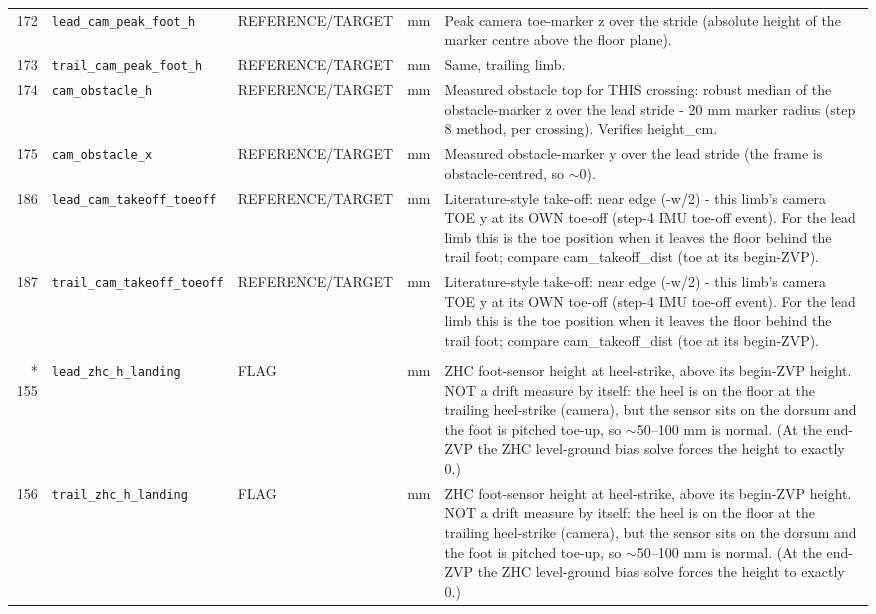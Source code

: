 \begin{longtable}{@{}r p{3.6cm} p{1.55cm} p{1.15cm} p{8.6cm}@{}}
172 & \texttt{lead\_\allowbreak{}cam\_\allowbreak{}peak\_\allowbreak{}foot\_\allowbreak{}h} & REFERENCE/TARGET & mm & Peak camera toe-marker z over the stride (absolute height of the marker centre above the floor plane). \\
173 & \texttt{trail\_\allowbreak{}cam\_\allowbreak{}peak\_\allowbreak{}foot\_\allowbreak{}h} & REFERENCE/TARGET & mm & Same, trailing limb. \\
174 & \texttt{cam\_\allowbreak{}obstacle\_\allowbreak{}h} & REFERENCE/TARGET & mm & Measured obstacle top for THIS crossing: robust median of the obstacle-marker z over the lead stride - 20 mm marker radius (step 8 method, per crossing). Verifies height\_cm. \\
175 & \texttt{cam\_\allowbreak{}obstacle\_\allowbreak{}x} & REFERENCE/TARGET & mm & Measured obstacle-marker y over the lead stride (the frame is obstacle-centred, so $\sim$0). \\
186 & \texttt{lead\_\allowbreak{}cam\_\allowbreak{}takeoff\_\allowbreak{}toeoff} & REFERENCE/TARGET & mm & Literature-style take-off: near edge (-w/2) - this limb's camera TOE y at its OWN toe-off (step-4 IMU toe-off event). For the lead limb this is the toe position when it leaves the floor behind the trail foot; compare cam\_takeoff\_dist (toe at its begin-ZVP). \\
187 & \texttt{trail\_\allowbreak{}cam\_\allowbreak{}takeoff\_\allowbreak{}toeoff} & REFERENCE/TARGET & mm & Literature-style take-off: near edge (-w/2) - this limb's camera TOE y at its OWN toe-off (step-4 IMU toe-off event). For the lead limb this is the toe position when it leaves the floor behind the trail foot; compare cam\_takeoff\_dist (toe at its begin-ZVP). \\
\addlinespace
\multicolumn{5}{@{}l}{\textbf{Quality flags and inclusion (25)}} \\*
155 & \texttt{lead\_\allowbreak{}zhc\_\allowbreak{}h\_\allowbreak{}landing} & FLAG & mm & ZHC foot-sensor height at heel-strike, above its begin-ZVP height. NOT a drift measure by itself: the heel is on the floor at the trailing heel-strike (camera), but the sensor sits on the dorsum and the foot is pitched toe-up, so $\sim$50--100 mm is normal. (At the end-ZVP the ZHC level-ground bias solve forces the height to exactly 0.) \\
156 & \texttt{trail\_\allowbreak{}zhc\_\allowbreak{}h\_\allowbreak{}landing} & FLAG & mm & ZHC foot-sensor height at heel-strike, above its begin-ZVP height. NOT a drift measure by itself: the heel is on the floor at the trailing heel-strike (camera), but the sensor sits on the dorsum and the foot is pitched toe-up, so $\sim$50--100 mm is normal. (At the end-ZVP the ZHC level-ground bias solve forces the height to exactly 0.) \\

\end{longtable}
